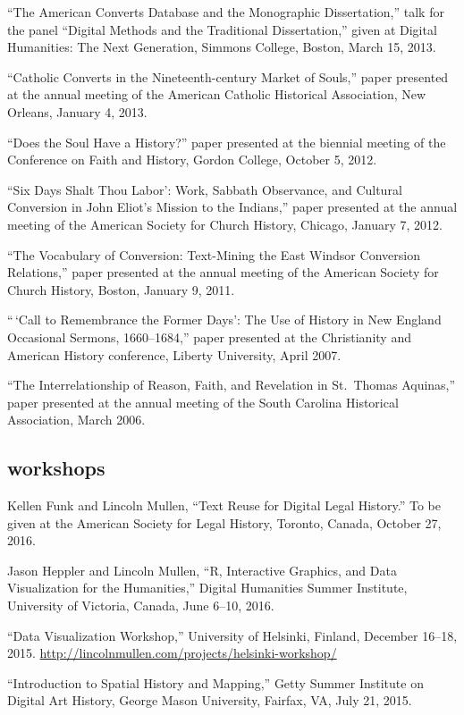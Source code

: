 \documentclass[11pt]{article}
\begin{document}
``The American Converts Database and the Monographic Dissertation,''
talk for the panel ``Digital Methods and the Traditional Dissertation,''
given at Digital Humanities: The Next Generation, Simmons College,
Boston, March 15, 2013.

``Catholic Converts in the Nineteenth-century Market of Souls,'' paper
presented at the annual meeting of the American Catholic Historical
Association, New Orleans, January 4, 2013.

``Does the Soul Have a History?'' paper presented at the biennial
meeting of the Conference on Faith and History, Gordon College, October
5, 2012.

``Six Days Shalt Thou Labor': Work, Sabbath Observance, and Cultural
Conversion in John Eliot's Mission to the Indians,'' paper presented at
the annual meeting of the American Society for Church History, Chicago,
January 7, 2012.

``The Vocabulary of Conversion: Text-Mining the East Windsor Conversion
Relations,'' paper presented at the annual meeting of the American
Society for Church History, Boston, January 9, 2011.

``\,`Call to Remembrance the Former Days': The Use of History in New
England Occasional Sermons, 1660--1684,'' paper presented at the
Christianity and American History conference, Liberty University, April
2007.

``The Interrelationship of Reason, Faith, and Revelation in St.~Thomas
Aquinas,'' paper presented at the annual meeting of the South Carolina
Historical Association, March 2006.

\subsection{workshops}\label{workshops}

Kellen Funk and Lincoln Mullen, ``Text Reuse for Digital Legal History.'' To be given at the American Society for Legal History, Toronto, Canada, October 27, 2016.

Jason Heppler and Lincoln Mullen, ``R, Interactive Graphics, and Data 
Visualization for the Humanities,'' Digital Humanities Summer Institute, 
University of Victoria, Canada, June 6--10, 2016.  

``Data Visualization Workshop,'' University of Helsinki, Finland, December 16--18, 
2015. \url{http://lincolnmullen.com/projects/helsinki-workshop/}

``Introduction to Spatial History and Mapping,'' Getty Summer Institute on 
Digital Art History, George Mason University, Fairfax, VA, July 21, 2015.
\end{document}
